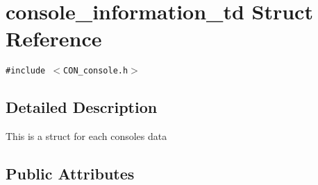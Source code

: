 \section{console\_\-information\_\-td Struct Reference}
\label{structconsole__information__td}
{\tt \#include $<$CON\_\-console.h$>$}



\subsection{Detailed Description}
This is a struct for each consoles data 

\subsection*{Public Attributes}
